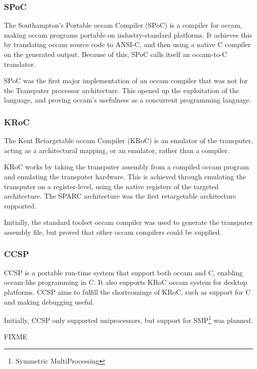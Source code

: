 \subsubsection{SPoC}
\label{sssec:spoc}

The Southampton's Portable occam Compiler (SPoC) \citep{spoc} is a compiler for occam, making occam programs portable on industry-standard platforms. It achieves this by translating occam source code to ANSI-C, and then using a native C compiler on the generated output. Because of this, SPoC calls itself an occam-to-C translator. 

SPoC was the first major implementation of an occam compiler that was not for the Transputer processor architecture. This opened up the exploitation of the language, and proving occam's usefulness as a concurrent programming language.


\subsubsection{KRoC}
\label{sssec:kroc}

The Kent Retargetable occam Compiler (KRoC) \citep{kroc} is an emulator of the transputer, acting as a architectural mapping, or an emulator, rather than a compiler.

KRoC works by taking the transputer assembly from a compiled occam program and emulating the transputer hardware. This is achieved through emulating the transputer on a register-level, using the native registers of the targeted architecture. The SPARC architecture was the first retargetable architecture supported. 

Initially, the standard toolset occam compiler was used to generate the transputer assembly file, but proved that other occam compilers could be supplied. 


\subsubsection{CCSP}
\label{sssec:ccsp}

CCSP \citep{ccsp} is a portable run-time system that support both occam and C, enabling occam-like programming in C. It also supports KRoC occam system for desktop platforms. CCSP aims to fulfill the shortcomings of KRoC, such as support for C and making debugging useful.

Initially, CCSP only supported uniprocessors, but support for SMP\footnote{Symmetric MultiProcessing} was planned. 

FIXME